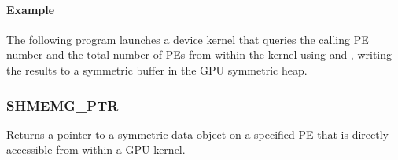 \paragraph*{\textbf{Example}}\mbox{}\par\nobreak
The following program launches a device kernel that queries the calling \ac{PE}
number and the total number of \acp{PE} from within the kernel using
 and , writing the results to a
symmetric buffer in the \ac{GPU} symmetric heap.



\subsubsection{SHMEMG\_PTR}\label{subsec:shmemg_ptr}

Returns a pointer to a symmetric data object on a specified \ac{PE} that is
directly accessible from within a \ac{GPU} kernel.

